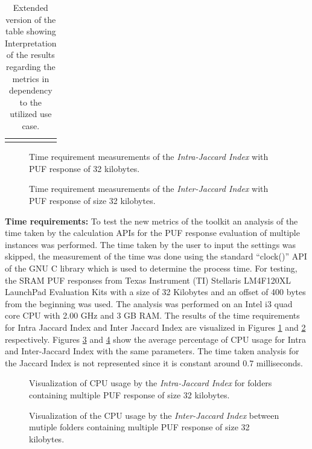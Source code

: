 \begin{table}[!ht]
\begin{tabular}{@{}lccccc@{}}
\addlinespace
\bottomrule
\end{tabular}
\caption{Extended version of the table showing Interpretation of the results regarding the metrics in dependency to the utilized use case.}
\label{tab:metrics}
\end{table}

\begin{figure}
\centering
{}
\caption{Time requirement measurements of the \emph{Intra-Jaccard Index} with PUF response of 32 kilobytes.}
\label{img:time_intra}
\end{figure}

\begin{figure}
\centering
{}
\caption{Time requirement measurements of the \emph{Inter-Jaccard Index} with PUF response of size 32 kilobytes.}
\label{img:time_inter}
\end{figure}

\textbf{Time requirements:} To test the new metrics of the toolkit an analysis of the time taken by the calculation APIs for the PUF response evaluation of multiple instances was performed. The time taken by the user to input the settings was skipped, the measurement of the time was done using the standard ``clock()'' API of the GNU C library which is used to determine the process time. For testing, the SRAM PUF responses from Texas Instrument (TI) Stellaris LM4F120XL LaunchPad Evaluation Kits with a
size of 32 Kilobytes and an offset of 400 bytes from the beginning was used. The analysis was performed on an Intel i3 quad core CPU with 2.00 GHz and 3 GB RAM. The results of the time requirements for Intra Jaccard Index and Inter Jaccard Index are visualized in Figures \ref{img:time_intra} and \ref{img:time_inter} respectively. Figures \ref{img:cpu_intra} and \ref{img:cpu_inter} show the average percentage of CPU usage for Intra and Inter-Jaccard Index with the same parameters. The time taken analysis for the Jaccard Index is not represented since it is constant around $0.7$ milliseconds.

\begin{figure}
\centering
{}
\caption{Visualization of CPU usage by the \emph{Intra-Jaccard Index} for folders containing multiple PUF response of size 32 kilobytes.}
\label{img:cpu_intra}
\end{figure}

\begin{figure}
\centering
{}
\caption{Visualization of the CPU usage by the \emph{Inter-Jaccard Index} between mutiple folders containing multiple PUF response of size 32 kilobytes.}
\label{img:cpu_inter}
\end{figure}
